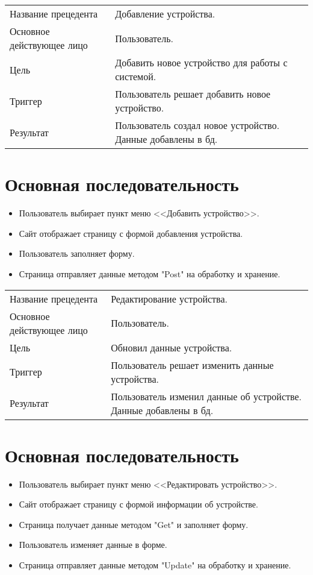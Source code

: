 \begin{table}[]
    \begin{tabular}{ll}
    Название прецедента       & Добавление устройства.\\
    Основное действующее лицо & Пользователь.\\
    Цель                      & Добавить новое устройство для работы с системой.\\
    Триггер                   & Пользователь решает добавить новое устройство.\\
    Результат                 & Пользователь создал новое устройство. Данные добавлены в бд.
    \end{tabular}
\end{table}

\section{Основная последовательность}
\begin{itemize}
    \item Пользователь выбирает пункт меню <<Добавить устройство>>.
    \item Сайт отображает страницу с формой добавления устройства.
    \item Пользователь заполняет форму.
    \item Страница отправляет данные методом "Post" на обработку и хранение. 
\end{itemize}

\begin{table}[]
    \begin{tabular}{ll}
    Название прецедента       & Редактирование устройства.\\
    Основное действующее лицо & Пользователь.\\
    Цель                      & Обновил данные устройства.\\
    Триггер                   & Пользователь решает изменить данные устройства.\\
    Результат                 & Пользователь изменил данные об устройстве. Данные добавлены в бд.
    \end{tabular}
\end{table}

\section{Основная последовательность}
\begin{itemize}
    \item Пользователь выбирает пункт меню <<Редактировать устройство>>.
    \item Сайт отображает страницу с формой информации об устройстве.
    \item Страница получает данные методом "Get" и заполняет форму. 
    \item Пользователь изменяет данные в форме.
    \item Страница отправляет данные методом "Update" на обработку и хранение. 
\end{itemize}

